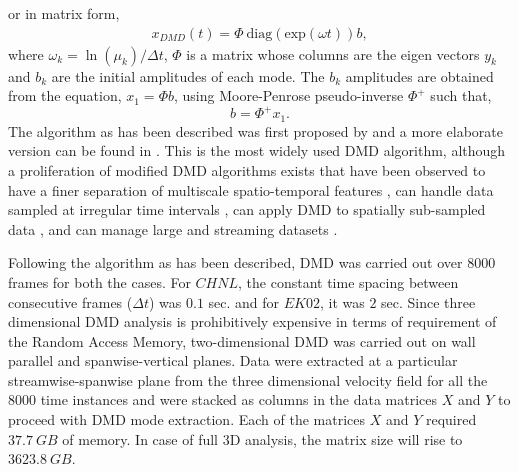 or in matrix form, 
\begin{align}
x_{DMD}(t)= \Phi\  \text{diag}(\text{exp}(\omega t)) b,
\end{align}
where $\omega_k = \ln (\mu_{k})/ \Delta t$, $\Phi$ is a matrix whose columns are the eigen vectors $y_{k} $ and $b_{k}$ are the initial amplitudes of each mode. The $b_{k}$ amplitudes are obtained from the equation, $x_1=\Phi b$, using Moore-Penrose pseudo-inverse $\Phi^{+}$ such that,
\begin{equation}
 b = \Phi^{+}x_{1} .
\end{equation}
The algorithm as has been described was first proposed by \citet{schmid_jfm2010} and a more elaborate version can be found in \citep{kutz_book2013, rowley_mezic_schlatter_jfm_2009,tu_thesis}. This is the most widely used DMD algorithm, although a proliferation of modified DMD algorithms exists that have been observed to have a finer separation of multiscale spatio-temporal features \citep[eg., ][]{kutz_fu_brunton_siam_2016}, can handle data sampled at irregular time intervals \citep[][]{tu_thesis}, can apply DMD to spatially sub-sampled data \citep{florimond_mathelin_pof_2015}, and can manage large and streaming datasets \citep{hemati_pof_2014}.

Following the algorithm as has been described, DMD was carried out over 8000 frames for both the cases. For $CHNL$, the constant time spacing between consecutive frames ($\Delta t$) was $0.1$ sec. and for $EK02$, it was $2$ sec. Since three dimensional DMD analysis is prohibitively expensive in terms of requirement of the Random Access Memory, two-dimensional DMD was carried out on wall parallel and spanwise-vertical planes. Data were extracted at a particular streamwise-spanwise plane from the three dimensional velocity field for all the 8000 time instances and were stacked as columns in the data matrices $X$ and $Y$ to proceed with DMD mode extraction. Each of the matrices  $X$ and $Y$ required $37.7\ GB$ of memory. In case of full 3D analysis, the matrix size will rise to $3623.8\ GB$. 

